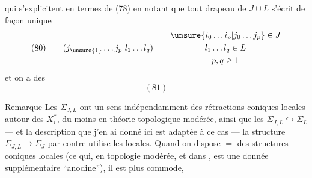 
qui s'explicitent en termes de (78) en notant que tout drapeau de $J\cup L$  s'écrit de façon unique
\[
(80)\qquad(j_{\unsure{1}}\ldots j_p\ l_1\ldots l_q)\qquad
\begin{gathered}
\unsure{i_0\ldots i_p|j_0\ldots j_p}\in J\\
l_1\ldots l_q\in L\\
p,q\geq1
\end{gathered}
\]
et  on a des
\[(81)\]

\uline{Remarque} Les $\Sigma_{J,L}$ ont un sens  indépendamment des rétractions coniques locales autour des $X_i^*$, du moins en théorie topologique modérée, ainsi que les $\Sigma_{J,L}\hookrightarrow\Sigma_L$ --- et la description que j'en ai donné ici est adaptée à ce cas --- la structure $\Sigma_{J,L}\to\Sigma_J$ par contre utilise les     locales. Quand on dispose $=$ des structures coniques locales (ce qui, en topologie modérée, et dans , est une donnée supplémentaire ``anodine''), il est plus commode,
